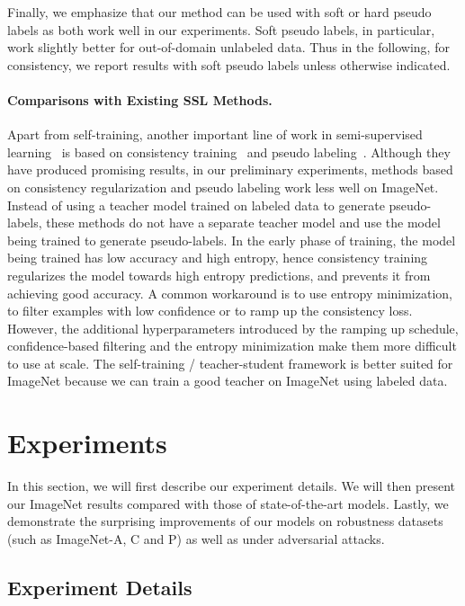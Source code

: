 \documentclass[10pt,twocolumn,letterpaper]{article}
\begin{document}
Finally, we emphasize that our method can be used with soft or hard pseudo labels as both work well in our experiments. Soft pseudo labels, in particular, work slightly better for out-of-domain unlabeled data. Thus in the following, for consistency, we report results with soft pseudo labels unless otherwise indicated.  

\paragraph{Comparisons with Existing SSL Methods.}
Apart from self-training, another important line of work in semi-supervised learning~\cite{chapelle2009semi,zhu2005semi} is based on consistency training~\cite{bachman2014learning,rasmus2015semi,laine2016temporal,tarvainen2017mean,miyato2018virtual,uda,mixmatch} and pseudo labeling~\cite{lee2013pseudo,iscen2019label,shi2018transductive,arazo2019pseudo}. 
Although they have produced promising results, in our preliminary experiments, methods based on consistency regularization and pseudo labeling work less well on ImageNet. Instead of using a teacher model trained on labeled data to generate pseudo-labels, these methods do not have a separate teacher model and use the model being trained to generate pseudo-labels. In the early phase of training, the model being trained has low accuracy and high entropy, hence consistency training regularizes the model towards high entropy predictions, and prevents it from achieving good accuracy. 
A common workaround is to use entropy minimization, to filter examples with low confidence or to ramp up the consistency loss. However, the additional hyperparameters introduced by the ramping up schedule, confidence-based filtering and the entropy minimization make them more difficult to use at scale. The self-training / teacher-student framework is better suited for ImageNet because we can train a good teacher on ImageNet using labeled data. 


\section{Experiments}
In this section, we will first describe our experiment details.
We will then present our ImageNet results compared with those of state-of-the-art models. Lastly, we demonstrate the surprising improvements of our models on robustness datasets (such as ImageNet-A, C and P) as well as under adversarial attacks.

\subsection{Experiment Details} 
\label{sec:exp_details}
\end{document}
